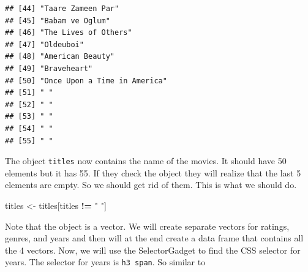 \documentclass[]{book}
\newenvironment{Shaded}{\begin{snugshade}}{\end{snugshade}}
\newcommand{\KeywordTok}[1]{\textcolor[rgb]{0.13,0.29,0.53}{\textbf{#1}}}
\newcommand{\NormalTok}[1]{#1}
\newcommand{\OperatorTok}[1]{\textcolor[rgb]{0.81,0.36,0.00}{\textbf{#1}}}
\newcommand{\StringTok}[1]{\textcolor[rgb]{0.31,0.60,0.02}{#1}}
\begin{document}
\begin{verbatim}
## [44] "Taare Zameen Par"                                 
## [45] "Babam ve Oglum"                                   
## [46] "The Lives of Others"                              
## [47] "Oldeuboi"                                         
## [48] "American Beauty"                                  
## [49] "Braveheart"                                       
## [50] "Once Upon a Time in America"                      
## [51] " "                                                
## [52] " "                                                
## [53] " "                                                
## [54] " "                                                
## [55] " "
\end{verbatim}

The object \texttt{titles} now contains the name of the movies. It should have 50 elements but it has 55. If they check the object they will realize that the last 5 elements are empty. So we should get rid of them. This is what we should do.

\begin{Shaded}
\begin{Highlighting}[]
\NormalTok{titles <-}\StringTok{ }\NormalTok{titles[titles }\OperatorTok{!=}\StringTok{ " "}\NormalTok{]}
\end{Highlighting}
\end{Shaded}

Note that the object is a vector. We will create separate vectors for ratings, genres, and years and then will at the end create a data frame that contains all the 4 vectors. Now, we will use the SelectorGadget to find the CSS selector for years. The selector for years is \texttt{h3\ span}. So similar to

\begin{Shaded}
\end{Shaded}
\end{document}
